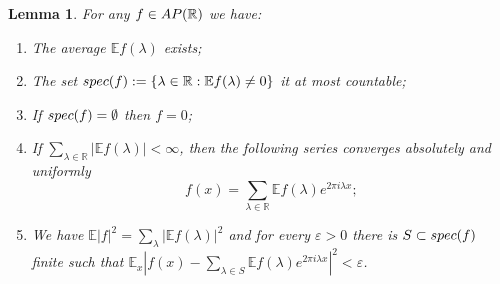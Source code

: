 \documentclass[a4paper,reqno,12pt]{amsart}
\newtheorem{lemma}[theorem]{Lemma}
\newcommand{\E}{\mathcal{E}}
\renewcommand{\r}{\mathbb{R}}
\newcommand{\la}{\lambda}
\newcommand{\ep}{\varepsilon}
\newcommand{\1}{{\bf 1}}
\renewcommand{\E}{\mathbb{E}}
\newcommand{\apr}{{\rm AP}(\r)}
\renewcommand{\1}{{\bo 1}}
\newcommand{\spec}{{\rm spec}}
\begin{document}
\begin{lemma}\label{lem:propAP}
For any $f\in \apr$ we have:
\begin{enumerate}
\item The average $\E f(\la)$ exists;
\item The set
$
\spec(f) := \{\la\in \r : \E f(\la) \neq 0\}
$
it at most countable;
\item If $\spec(f)=\emptyset$ then $f=0$;
\item If $\sum_{\la\in \r} |\E f(\la)|<\infty$, then the following series converges absolutely and uniformly
$$
f(x)=\sum_{\la\in \r} \E f(\la)e^{2\pi i \la x};
$$
\item We have $\E |f|^2 = \sum_{\la} |\E f(\la)|^2$ and for every $\ep>0$ there is $S\subset \spec(f)$ finite such that $\E_x|f(x)-\sum_{\la\in S}\E f(\la)e^{2\pi i \la x }|^2<\ep$.
\end{enumerate}
\end{lemma}
\end{document}
